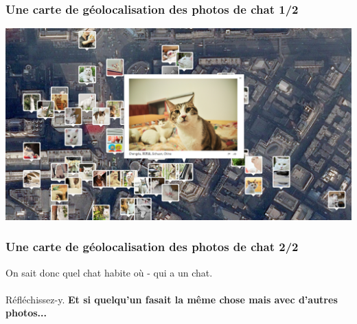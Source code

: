 \documentclass{beamer}
\begin{document}
\begin{frame}
\frametitle{Une carte de géolocalisation des photos de chat 1/2}
\begin{center}
\includegraphics[scale=0.3]{./images/Chat_geolocalisaion.png}
\end{center}
\end{frame}
\begin{frame}
\frametitle{Une carte de géolocalisation des photos de chat 2/2}
On sait donc quel chat habite où - qui a un chat.
\\~\\
Réfléchissez-y. \textbf{Et si quelqu'un fasait la même chose mais avec d'autres photos...}
\end{frame}
\end{document}
